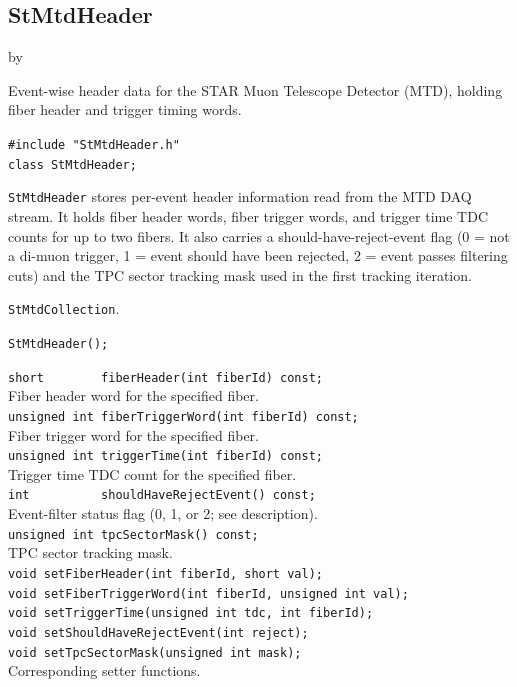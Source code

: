 \documentclass[twoside]{article}
\newcommand{\entrylabel}[1]{\mbox{\textbf{{#1}}}\hfil}%
\newenvironment{entry}
{\begin{list}{}%
    {\renewcommand{\makelabel}{\entrylabel}%
     \setlength{\labelwidth}{90pt}%
     \setlength{\leftmargin}{\labelwidth}
     \advance\leftmargin by \labelsep%
      }%
    }%
  {\end{list}}
\newcommand{\Entrylabel}[1]%
{\raisebox{0pt}[1ex][0pt]{\makebox[\labelwidth][l]%
    {\parbox[t]{\labelwidth}{\hspace{0pt}\textbf{{#1}}}}}}
\newenvironment{Entry}%
{\renewcommand{\entrylabel}{\Entrylabel}\begin{entry}}%
  {\end{entry}}
\begin{document}
\subsection{StMtdHeader}
\label{sec:StMtdHeader}
\begin{Entry}
\item[Summary] Event-wise header data for the STAR Muon Telescope Detector
    (MTD), holding fiber header and trigger timing words.
\item[Synopsis]
    \verb+#include "StMtdHeader.h"+\\
    \verb+class StMtdHeader;+\\
\item[Description]
    \texttt{StMtdHeader} stores per-event header information read from the
    MTD DAQ stream.  It holds fiber header words, fiber trigger words, and
    trigger time TDC counts for up to two fibers.  It also carries a
    should-have-reject-event flag (0 = not a di-muon trigger, 1 = event
    should have been rejected, 2 = event passes filtering cuts) and the TPC
    sector tracking mask used in the first tracking iteration.
\item[Related Classes]
    \texttt{StMtdCollection}.
\item[Public\\ Constructors]
    \verb+StMtdHeader();+\\
\item[Public Member\\ Functions]
    \verb+short        fiberHeader(int fiberId) const;+\\
    Fiber header word for the specified fiber.\\
    \verb+unsigned int fiberTriggerWord(int fiberId) const;+\\
    Fiber trigger word for the specified fiber.\\
    \verb+unsigned int triggerTime(int fiberId) const;+\\
    Trigger time TDC count for the specified fiber.\\
    \verb+int          shouldHaveRejectEvent() const;+\\
    Event-filter status flag (0, 1, or 2; see description).\\
    \verb+unsigned int tpcSectorMask() const;+\\
    TPC sector tracking mask.\\
    \verb+void setFiberHeader(int fiberId, short val);+\\
    \verb+void setFiberTriggerWord(int fiberId, unsigned int val);+\\
    \verb+void setTriggerTime(unsigned int tdc, int fiberId);+\\
    \verb+void setShouldHaveRejectEvent(int reject);+\\
    \verb+void setTpcSectorMask(unsigned int mask);+\\
    Corresponding setter functions.\\
\end{Entry}
\clearpage
\end{document}
